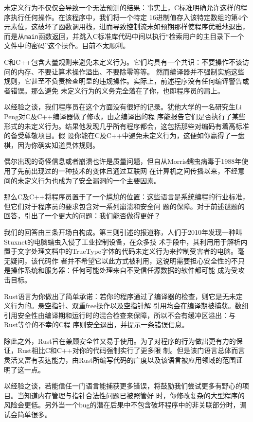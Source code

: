 \smallskip
未定义行为不仅仅会导致一个无法预测的结果：事实上，C标准明确允许这样的程序执行任何操作。在该程序中，我们将一个特定
16进制值存入该特定数组的第4个元素位，这破坏了函数调用栈，进而导致控制流未如预期那样使程序优雅地退出，而是从\texttt{main}函数返回，并跳入C标准库代码中间以执行“检索用户的主目录下一个文件中的密码”这个操作。目前不太顺利。

\medskip
C和C++包含大量规则来避免未定义行为。它们均具有一个共识：不要操作不该访问的内存、不要让算术操作溢出、不要除零等等。
然而编译器并不强制实施这些规则，它甚至不负责检查明显的违规操作。实际上，前述程序没有任何编译警告或者错误。那么避免
未定义行为的义务完全落在了你，也即程序员的肩上。

\medskip
以经验之谈，我们程序员在这个方面没有很好的记录。犹他大学的一名研究生Li Peng对C及C++编译器做了修改，由之编译出的程
序能报告它们是否执行了某些形式的未定义行为。结果他发现几乎所有程序都会，这包括那些对编码有着高标准的备受尊敬项目。假
设你能在C及C++中避免未定义行为，这便如你赢得了一盘棋，因为你确实知道具体规则。

\medskip
偶尔出现的奇怪信息或者崩溃也许是质量问题，但自从Morris蠕虫病毒于1988年使用了先前出现过的一种技术的变体且通过互联网
在计算机之间传播以来，不经意间的未定义行为也成为了安全漏洞的一个主要因素。

\medskip
那么C及C++将程序员置于了一个尴尬的位置：这些语言是系统编程的行业标准，但它们对于程序员的要求包含对一系列崩溃和安全问
题的保障。对于前述谜题的回答，引出了一个更大的问题：我们能否做得更好？

我们的回答由三条开场白构成。第三则引述的报道称，人们于2010年发现一种叫Stuxnet的电脑蠕虫入侵了工业控制设备，在众多技
术手段中，其利用用于解析内置于文字处理文档中的TrueType字体的代码未定义行为来控制受害者的电脑。毫无疑问，该代码作
者并不希望它以此方式被利用，这说明需要担心安全性的不只是操作系统和服务器：任何可能处理来自不受信任源数据的软件都可能
成为受攻击目标。

\medskip
Rust语言为你做出了简单承诺：若你的程序通过了编译器的检查，则它是无未定义行为的。悬空指针、双重free操作以及空指针解
引用均会在编译期被捕获。数组引用安全性由编译期和运行时的混合检查来保障，所以不会有缓冲区溢出：与Rust等价的不幸的C程
序则安全退出，并提示一条错误信息。

\medskip
除此之外，Rust旨在兼顾安全性又易于使用。为了对程序的行为做出更有力的保证，Rust相比C和C++对你的代码强制实行了更多限
制。但是该门语言总体而言灵活又富有表达能力，由Rust所编写代码的广度以及该语言被应用领域的范围证明了这一点。

\medskip
以经验之谈，若能信任一门语言能捕获更多错误，将鼓励我们尝试更多有野心的项目。当知道内存管理与指针合法性问题已被照管好
时，你修改复杂的大型程序的风险会更低。另外当一个bug的潜在后果中不包含破坏程序中的非关联部分时，调试会简单很多。

